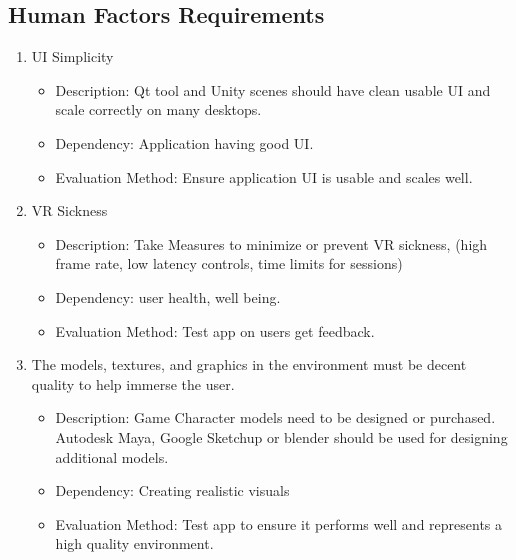 \documentclass[a4paper,10pt]{article}
\begin{document}
	\subsection{Human Factors Requirements}
	\begin{enumerate}
	\item UI Simplicity
	    \begin{itemize}
	      \item Description: Qt tool and Unity scenes should have clean usable UI and scale correctly on many desktops.
	      \item Dependency:  Application having good UI.
	      \item Evaluation Method: Ensure application UI is usable and scales well.
	    \end{itemize}
	\item VR Sickness	 
	    \begin{itemize}
	      \item Description: Take Measures to minimize or prevent VR sickness, (high frame rate, low latency controls, time limits for sessions)
	      \item Dependency: user health, well being.
	      \item Evaluation Method: Test app on users get feedback.
	    \end{itemize}
	\item The models, textures, and graphics in the environment must be decent quality to help immerse the user.
	    \begin{itemize}
	      \item Description: Game Character models need to be designed or purchased. Autodesk Maya, Google Sketchup or blender should be used for designing additional models. 
	      \item Dependency: Creating realistic visuals 
	      \item Evaluation Method: Test app to ensure it performs well and represents a high quality environment.
	    \end{itemize}
	\end{enumerate}
	
\end{document}
